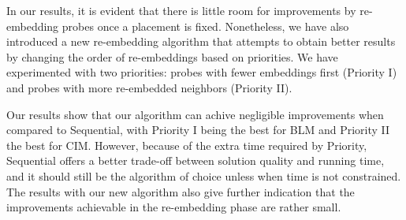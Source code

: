 In our results, it is evident that there is little room for improvements by
re-embedding probes once a placement is fixed. Nonetheless, we have also
introduced a new re-embedding algorithm that attempts to obtain better results
by changing the order of re-embeddings based on priorities. We have experimented
with two priorities: probes with fewer embeddings first (Priority I) and probes
with more re-embedded neighbors (Priority II).

Our results show that our algorithm can achive negligible improvements when
compared to Sequential, with Priority I being the best for BLM and Priority II
the best for CIM. However, because of the extra time required by Priority,
Sequential offers a better trade-off between solution quality and running time,
and it should still be the algorithm of choice unless when time is not
constrained. The results with our new algorithm also give further indication
that the improvements achievable in the re-embedding phase are rather small.
